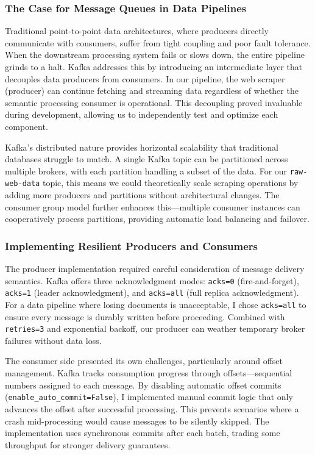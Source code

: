 \documentclass[12pt, a4paper]{article}
\begin{document}
\subsubsection*{The Case for Message Queues in Data Pipelines}

Traditional point-to-point data architectures, where producers directly communicate with consumers, suffer from tight coupling and poor fault tolerance. When the downstream processing system fails or slows down, the entire pipeline grinds to a halt. Kafka addresses this by introducing an intermediate layer that decouples data producers from consumers. In our pipeline, the web scraper (producer) can continue fetching and streaming data regardless of whether the semantic processing consumer is operational. This decoupling proved invaluable during development, allowing us to independently test and optimize each component.

Kafka's distributed nature provides horizontal scalability that traditional databases struggle to match. A single Kafka topic can be partitioned across multiple brokers, with each partition handling a subset of the data. For our \texttt{raw-web-data} topic, this means we could theoretically scale scraping operations by adding more producers and partitions without architectural changes. The consumer group model further enhances this—multiple consumer instances can cooperatively process partitions, providing automatic load balancing and failover.

\subsubsection*{Implementing Resilient Producers and Consumers}

The producer implementation required careful consideration of message delivery semantics. Kafka offers three acknowledgment modes: \texttt{acks=0} (fire-and-forget), \texttt{acks=1} (leader acknowledgment), and \texttt{acks=all} (full replica acknowledgment). For a data pipeline where losing documents is unacceptable, I chose \texttt{acks=all} to ensure every message is durably written before proceeding. Combined with \texttt{retries=3} and exponential backoff, our producer can weather temporary broker failures without data loss.

The consumer side presented its own challenges, particularly around offset management. Kafka tracks consumption progress through offsets—sequential numbers assigned to each message. By disabling automatic offset commits (\texttt{enable\_auto\_commit=False}), I implemented manual commit logic that only advances the offset after successful processing. This prevents scenarios where a crash mid-processing would cause messages to be silently skipped. The implementation uses synchronous commits after each batch, trading some throughput for stronger delivery guarantees.
\end{document}
